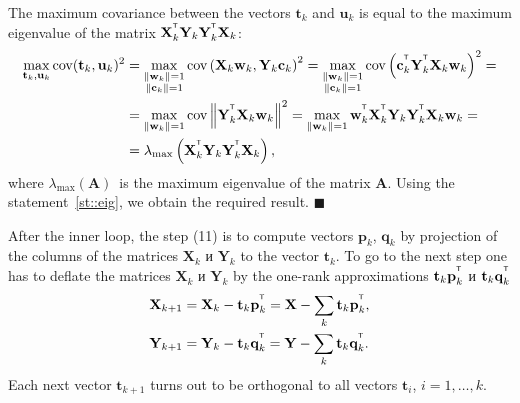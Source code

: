 \documentclass[12pt,twoside]{article}
\newcommand{\bw}{\mathbf{w}}
\newcommand{\bY}{\mathbf{Y}}
\newcommand{\bX}{\mathbf{X}}
\newcommand{\bu}{\mathbf{u}}
\newcommand{\bt}{\mathbf{t}}
\newcommand{\bp}{\mathbf{p}}
\newcommand{\bq}{\mathbf{q}}
\newcommand{\bc}{\mathbf{c}}
\newcommand{\T}{^{\text{\tiny\sffamily\upshape\mdseries T}}}
\begin{document}
The maximum covariance between the vectors $\bt_k$ and $\bu_k$ is equal to the maximum eigenvalue of the matrix $\bX_k^{\T} \bY_k \bY_k^{\T} \bX_k$:
\begin{align*}
\max_{\bt_k, \bu_k}  \text{cov} (\bt_k, \bu_k)^2 &= \max_{\substack{\|\bw_k\|=1 \\ \|\bc_k\| = 1}} \text{cov} \left( \bX_k \bw_k, \bY_k \bc_k \right)^2 = \max_{\substack{\|\bw_k\|=1 \\ \|\bc_k\| = 1}} \text{cov} \left(\bc_k^{\T}  \bY_k^{\T} \bX_k \bw_k \right)^2 = \\
&= \max_{\|\bw_k\| = 1} \text{cov} \left\|\bY_k^{\T} \bX_k \bw_k \right\|^2 = \max_{\|\bw_k\| = 1} \bw_k^{\T} \bX_k^{\T} \bY_k \bY_k^{\T} \bX_k \bw_k = \\
& = \lambda_{\max} \left( \bX_k^{\T} \bY_k \bY_k^{\T} \bX_k \right),
\end{align*}
where $ \lambda_{\max} (\mathbf{A})$~is the maximum eigenvalue of the matrix $\mathbf{A}$.
Using the statement~\ref{st::eig}, we obtain the required result.
$\blacksquare$

After the inner loop, the step (11) is to compute vectors $\bp_k$, $\bq_k$ by projection of the columns of the matrices $\bX_k$ и $\bY_k$ to the vector $\bt_k$. 
To go to the next step one has to deflate the matrices $\bX_k$ и $\bY_k$ by the one-rank approximations $\bt_k \bp_k^{\T}$ и $\bt_k \bq_k^{\T}$
\begin{align*}
    \bX_{k + 1} &= \bX_{k} - \bt_k \bp_k^{\T} = \bX - \sum_k \bt_k \bp_k^{\T}, \\
    \bY_{k + 1} &= \bY_{k} - \bt_k \bq_k^{\T} = \bY - \sum_k \bt_k \bq_k^{\T}.
\end{align*}
Each next vector $\bt_{k+1}$ turns out to be orthogonal to all vectors $\bt_i$, $i=1, \dots, k$.
\end{document}

